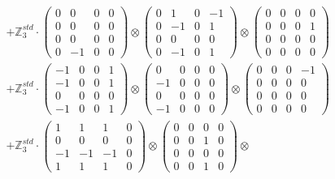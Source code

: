 \documentclass{article}
\begin{document}
{\begin{align}
        &+ \label{Rs16-Rc11-Solution-1-c22} \mathbb{Z}_3^{std} \cdot 
            \begin{pmatrix} 0 & 0 & 0 & 0 \\ 0 & 0 & 0 & 0 \\ 0 & 0 & 0 & 0 \\ 0 & -1 & 0 & 0 \end{pmatrix} \otimes 
            \begin{pmatrix} 0 & 1 & 0 & -1 \\ 0 & -1 & 0 & 1 \\ 0 & 0 & 0 & 0 \\ 0 & -1 & 0 & 1 \end{pmatrix} \otimes 
            \begin{pmatrix} 0 & 0 & 0 & 0 \\ 0 & 0 & 0 & 1 \\ 0 & 0 & 0 & 0 \\ 0 & 0 & 0 & 0 \end{pmatrix} \\ 
        &+ \label{Rs16-Rc11-Solution-1-c23} \mathbb{Z}_3^{std} \cdot 
            \begin{pmatrix} -1 & 0 & 0 & 1 \\ -1 & 0 & 0 & 1 \\ 0 & 0 & 0 & 0 \\ -1 & 0 & 0 & 1 \end{pmatrix} \otimes 
            \begin{pmatrix} 0 & 0 & 0 & 0 \\ -1 & 0 & 0 & 0 \\ 0 & 0 & 0 & 0 \\ -1 & 0 & 0 & 0 \end{pmatrix} \otimes 
            \begin{pmatrix} 0 & 0 & 0 & -1 \\ 0 & 0 & 0 & 0 \\ 0 & 0 & 0 & 0 \\ 0 & 0 & 0 & 0 \end{pmatrix} \\ 
        &+ \label{Rs16-Rc11-Solution-1-c24} \mathbb{Z}_3^{std} \cdot 
            \begin{pmatrix} 1 & 1 & 1 & 0 \\ 0 & 0 & 0 & 0 \\ -1 & -1 & -1 & 0 \\ 1 & 1 & 1 & 0 \end{pmatrix} \otimes 
            \begin{pmatrix} 0 & 0 & 0 & 0 \\ 0 & 0 & 1 & 0 \\ 0 & 0 & 0 & 0 \\ 0 & 0 & 1 & 0 \end{pmatrix} \otimes 

\end{align}}
\end{document}
